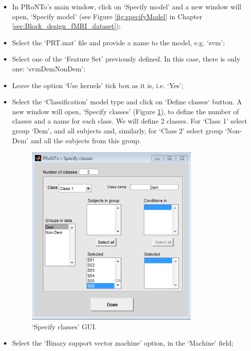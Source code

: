 \begin{itemize}
	
	\item In PRoNTo's main window, click on `Specify model' and a new window will open, `Specify model' (see Figure \ref{fig:specifyModel} in Chapter \ref{sec:Block_design_fMRI_dataset});

	\item Select the `PRT.mat' file and provide a name to the model, e.g. `svm';
	
	\item Select one of the `Feature Set' previously defined. In this case, there is only one:  `svmDemNonDem';
	
	\item Leave the option `Use kernels' tick box as it is, i.e. `Yes';

	\item	Select the `Classification' model type and click on `Define classes` button. A new window will open, `Specify classes' (Figure \ref{fig:classes}), to define the number of classes and a name for each class. We will define 2 classes. For `Class 1' select group `Dem', and all subjects and, similarly, for `Class 2' select group `Non-Dem' and all the subjects from this group.
	
\begin{figure}[!h]
	\centering
		\includegraphics[height=9cm]{images/Tutorial/confounds/classes.png}
	\caption{`Specify classes' GUI.}
	\label{fig:classes}
\end{figure}
	
	\item Select the `Binary support vector machine' option, in the `Machine' field;
	

\end{itemize}
